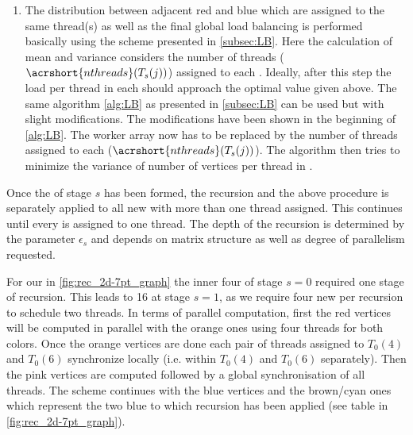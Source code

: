 \begin{enumerate}
	\item The distribution between adjacent red and blue \levelGroups which are assigned to the same thread(s) as well as the final global load balancing is performed basically using the scheme presented in \cref{subsec:LB}. 
	Here the calculation of mean and variance considers the number of threads ($\acrshort{nthreads}(T_{s}(j))$) assigned to each \levelGroup . Ideally, after this step the load per thread in each \levelGroup should approach the optimal value given above.
	The same algorithm \cref{alg:LB} as presented in \cref{subsec:LB} can be used but with slight modifications. The modifications have been shown in the beginning of \cref{alg:LB}. The worker array now has to be replaced by the number of threads assigned to each \levelGroup ($\acrshort{nthreads}(T_{s}(j))$). The algorithm then tries to minimize the variance of number of vertices per thread in \levelGroups.
\end{enumerate}
Once the \levelGroup of stage $s$ has been formed, the recursion and the above procedure is separately applied to all new \levelGroups with more than one thread assigned. This continues until every \levelGroup is assigned to one thread. The depth of the recursion is determined by the parameter $\epsilon_s$ and depends on matrix structure as well as degree of parallelism requested. 

For our \stex in  \cref{fig:rec_2d-7pt_graph} the inner four \levelGroups of stage $s=0$ required one stage of recursion. This leads to 16 \levelGroups at stage $s=1$, as we require four new \levelGroups per recursion to schedule two threads. 
In terms of parallel computation, first the red vertices will be computed in parallel with the orange ones using four threads for both colors. Once the orange vertices are done each pair of threads assigned to $T_0(4)$ and $T_0(6)$ synchronize locally (i.e. within $T_0(4)$ and $T_0(6)$ separately). Then the pink vertices are computed followed by a global synchronisation of all threads. The scheme continues with the blue vertices and the brown/cyan ones which represent the two blue \levelGroups to which recursion has been applied (see table in \cref{fig:rec_2d-7pt_graph}).  

